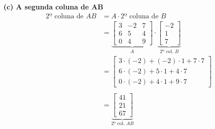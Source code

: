 \documentclass[a4paper,12pt]{article}
\begin{document}
\textbf{(c) A segunda coluna de AB}
\begin{align*}
    \text{2º coluna de } AB &= A \cdot \text{2º coluna de }B\\
    &=
    \underbrace{
    \begin{bmatrix}
        3 & -2 & 7 \\
        6 &  5 & 4 \\
        0 &  4 & 9
    \end{bmatrix}}_{A}
    \cdot
    \underbrace{
    \begin{bmatrix}
        -2 \\
         1 \\
         7
    \end{bmatrix}}_{\text{2º col. }B} \\
    &=
    \begin{bmatrix}
        3 \cdot (-2) + (-2) \cdot 1 + 7 \cdot 7 \\
        6 \cdot (-2) +   5  \cdot 1 + 4 \cdot 7 \\
        0 \cdot (-2) +   4  \cdot 1 + 9 \cdot 7
    \end{bmatrix}\\ \\
    &=
    \underbrace{
    \begin{bmatrix}
        41 \\
        21 \\
        67
    \end{bmatrix}}_{\text{2º col. }AB}
\end{align*}
\end{document}
